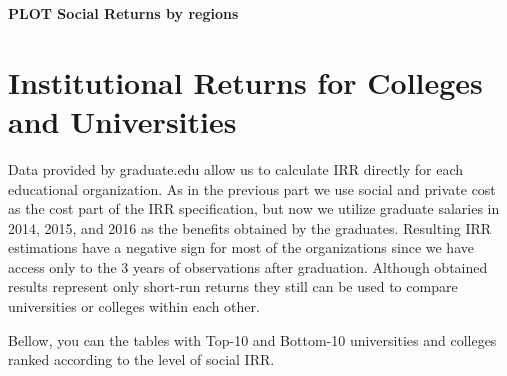 \documentclass[alpha-refs]{wiley-article-05g}
\begin{document}
\textbf{PLOT Social Returns by regions}


\section{Institutional Returns for Colleges and Universities}

Data provided by graduate.edu allow us to calculate IRR directly for each educational organization. As in the previous part we use social and private cost as the cost part of the IRR specification, but now we utilize graduate salaries in 2014, 2015, and 2016 as the benefits obtained by the graduates. Resulting IRR estimations have a negative sign for most of the organizations since we have access only to the 3 years of observations after graduation. Although obtained results represent only short-run returns they still can be used to compare universities or colleges within each other.

Bellow, you can the tables with Top-10 and Bottom-10 universities and colleges ranked according to the level of social IRR.
\end{document}
